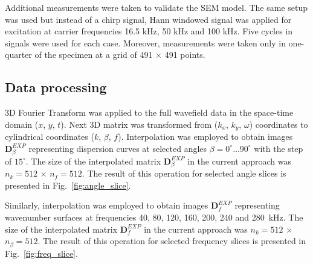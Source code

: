 \documentclass[preprint,12pt]{elsarticle}
\newcommand{\matr}[1]{\mathbf{#1}} %
\begin{document}
Additional measurements were taken to validate the SEM model. 
The same setup was used but instead of a chirp signal, Hann windowed signal was applied for excitation at carrier frequencies 16.5 kHz, 50 kHz and 100 kHz. 
Five cycles in signals were used for each case. 
Moreover, measurements were taken only in one-quarter of the specimen at a grid of 491 $\times$ 491 points.
\subsection{Data processing}
3D Fourier Transform was applied to the full wavefield data in the space-time domain ($x$, $y$, $t$). 
Next 3D matrix was transformed from ($k_x$, $k_y$, $\omega$) coordinates to cylindrical coordinates ($k$, $\beta$, $f$). 
Interpolation was employed to obtain images $\matr{D}_{\beta}^{EXP}$ representing dispersion curves at selected angles $\beta = 0^{\circ} \ldots 90^{\circ}$ with the step of $15^{\circ}$. 
The size of the interpolated matrix $\matr{D}_{\beta}^{EXP}$ in the current approach was $n_k=512$ $\times$ $n_f= 512$. 
The result of this operation for selected angle slices is presented in Fig.~\ref{fig:angle_slice}. 

Similarly, interpolation was employed to obtain images $\matr{D}_{f}^{EXP}$ representing wavenumber surfaces at frequencies 40, 80, 120, 160, 200, 240 and 280~kHz.
The size of the interpolated matrix $\matr{D}_{f}^{EXP}$ in the current approach was $n_k=512$ $\times$ $n_{\beta}= 512$.
The result of this operation for selected frequency slices is presented in Fig.~\ref{fig:freq_slice}.
\end{document}
